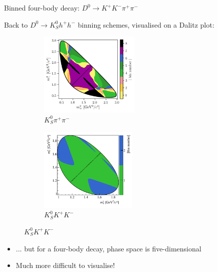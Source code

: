 \documentclass[dvipsnames]{beamer}
\begin{document}
\begin{frame}{Binned four-body decay: $D^0\to K^+K^-\pi^+\pi^-$}
  \begin{center}
    {\large Back to $D^0\to K_S^0h^+h^-$ binning schemes, visualised on a Dalitz plot:}
  \end{center}
  \vspace{-0.3cm}
  \begin{figure}
    \begin{subfigure}{0.45\textwidth}
      \includegraphics[height = 4cm]{Plots/KsPiPi_optimal.png}
      \vspace{-0.3cm}
      \caption*{$K_S^0\pi^+\pi^-$}
    \end{subfigure}%
    \begin{subfigure}{0.45\textwidth}
      \includegraphics[height = 4cm]{Plots/KsKK_binning.png}
      \vspace{-0.3cm}
      \caption*{$K_S^0K^+K^-$}
    \end{subfigure}
  \end{figure}
  \begin{itemize}
    \setlength\itemsep{0.5em}
    \item{... but for a four-body decay, phase space is five-dimensional}
    \item{Much more difficult to visualise!}
  \end{itemize}
\end{frame}
\end{document}
